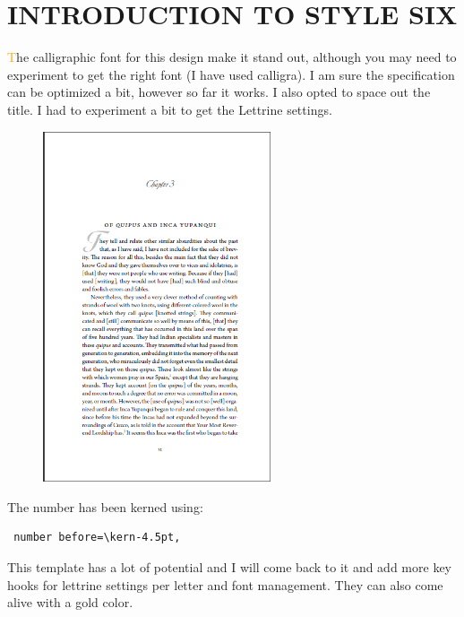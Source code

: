 

\chapter{INTRODUCTION TO STYLE SIX}
\renewcommand{\DefaultLhang}{0.1}
\renewcommand{\LettrineFontHook}{\calligra}
\setlength{\DefaultFindent}{9.5pt}
\setlength{\DefaultNindent}{0pt}

\lettrine{\textcolor{orange}{T}}{}he calligraphic font for this design make it stand out, although you may need to experiment to get the right font (I have used calligra). I am sure the specification can be optimized a bit, however so far it works. I also opted to space out the title. I had to experiment a bit to get the Lettrine settings.
\medskip
\begin{figure}[ht]
\centering
\includegraphics[width=0.6\textwidth]{./chapters/chapter06}
\end{figure}

The number has been kerned using:

\begin{lstlisting}
 number before=\kern-4.5pt,
\end{lstlisting}

This template has a lot of potential and I will come back to it and add more key hooks for lettrine settings per letter and font management. They can also come alive with a gold color.

